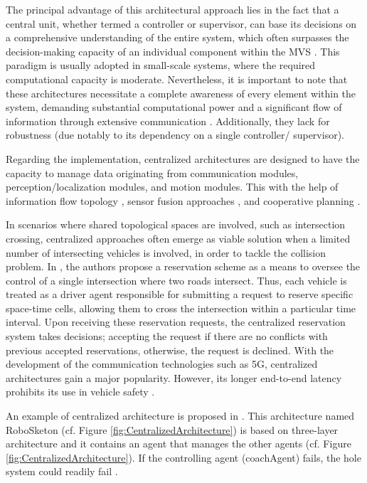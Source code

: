 The principal advantage of this architectural approach lies in the fact that a central unit, whether termed a controller or supervisor, can base its decisions on a comprehensive understanding of the entire system, which often surpasses the decision-making capacity of an individual component within the MVS \cite{khoshnevis1998centralized}. This paradigm is usually adopted in small-scale systems,
where the required computational capacity is moderate. Nevertheless, it is important to note that these architectures necessitate a complete awareness of every element within the system, demanding substantial computational power and a significant flow of information through extensive communication  \cite{khoshnevis1998centralized}\cite{yuta1992coordinating}. Additionally, they lack for robustness (due notably to its dependency on a single controller/ supervisor). 

Regarding the implementation, centralized architectures are designed to have the capacity to manage data originating from communication modules, perception/localization modules, and motion modules. This with the help of information flow topology \cite{zheng2015stability}, sensor fusion approaches \cite{gruyer2017perception}, and cooperative planning \cite{ren2008distributed}.

In scenarios where shared topological spaces are involved, such as intersection crossing, centralized approaches often emerge as viable solution when a limited number of intersecting vehicles is involved, in order to tackle the collision problem. In \cite{dresner2004multiagent}, the authors propose a reservation scheme as a means to oversee the control of a single intersection where two roads intersect. Thus, each vehicle is treated as a driver agent responsible for submitting a request to reserve specific space-time cells, allowing them to cross the intersection within a particular time interval. Upon receiving these reservation requests, the centralized reservation system takes decisions; accepting the request if there are no conflicts with previous accepted reservations, otherwise, the request is declined. With the development of the communication technologies such as 5G, centralized architectures gain a major popularity. However, its longer end-to-end latency prohibits its use in vehicle safety \cite{machardy2018v2x}. 

An example of centralized architecture is proposed in \cite{ventura2015safe}\cite{camacho2006roboskeleton}. This architecture named RoboSketon (cf. Figure \ref{fig:CentralizedArchitecture}) is based on three-layer architecture and it contains an agent that manages the other agents (cf. Figure \ref{fig:CentralizedArchitecture}). If the controlling agent (coachAgent) fails, the hole system could readily fail \cite{ventura2015safe}.  

